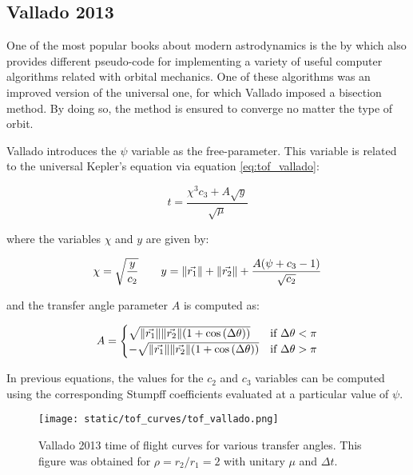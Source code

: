 \subsection{Vallado 2013}

One of the most popular books about modern astrodynamics is the
 by which also provides different pseudo-code for
implementing a variety of useful computer algorithms related with orbital
mechanics. One of these algorithms was an improved version of the
\cite{bate1971} universal one, for which Vallado imposed a bisection method. By
doing so, the method is ensured to converge no matter the type of orbit.

Vallado introduces the $\psi$ variable as the free-parameter. This variable is
related to the universal Kepler's equation via equation \ref{eq:tof_vallado}:

\begin{equation}
  t = \frac{\chi^3 c_3 + A \sqrt{y}}{\sqrt{\mu}}
  \label{eq:tof_vallado}
\end{equation}

where the variables $\chi$ and $y$ are given by:

\begin{equation}
  \chi = \sqrt{\frac{y}{c_2}}\quad\quad
  y = \lVert\vec{r_1}\rVert + \lVert\vec{r_2}\rVert + \frac{A(\psi + c_3 - 1)}{\sqrt{c_2}}
\end{equation}

and the transfer angle parameter $A$ is computed as:

\begin{equation}
  A =
  \begin{cases}
    \sqrt{\lVert\vec{r_1}\rVert \lVert\vec{r_2}\rVert (1 + \cos{(\Delta \theta)})}  & \text{if $\Delta \theta < \pi$} \\
    -\sqrt{\lVert\vec{r_1}\rVert \lVert\vec{r_2}\rVert (1 + \cos{(\Delta \theta)})} & \text{if $\Delta \theta > \pi$} \\
  \end{cases}
\end{equation}

In previous equations, the values for the $c_2$ and $c_3$ variables can be
computed using the corresponding Stumpff coefficients evaluated at a particular
value of $\psi$.

\vspace{0.5cm}
\begin{figure}[h]
  \centering
  \texttt{[image: static/tof\_curves/tof\_vallado.png]}
  \caption{Vallado 2013 time of flight curves for various transfer angles. This
    figure was obtained for $\rho=r_2/r_1=2$ with unitary $\mu$ and $\Delta t$.}
  \label{fig:tof_vallado}
\end{figure}

